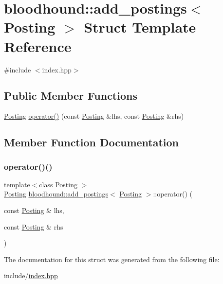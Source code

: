 \hypertarget{structbloodhound_1_1add__postings}{}\section{bloodhound\+:\+:add\+\_\+postings$<$ Posting $>$ Struct Template Reference}
\label{structbloodhound_1_1add__postings}


{\ttfamily \#include $<$index.\+hpp$>$}

\subsection*{Public Member Functions}
\begin{DoxyCompactItemize}
\item 
\mbox{\hyperlink{structbloodhound_1_1Posting}{Posting}} \mbox{\hyperlink{structbloodhound_1_1add__postings_ab57eba72e4d13d7f3c74d749d51c0f34}{operator()}} (const \mbox{\hyperlink{structbloodhound_1_1Posting}{Posting}} \&lhs, const \mbox{\hyperlink{structbloodhound_1_1Posting}{Posting}} \&rhs)
\end{DoxyCompactItemize}


\subsection{Member Function Documentation}
\mbox{\label{structbloodhound_1_1add__postings_ab57eba72e4d13d7f3c74d749d51c0f34}} 
\subsubsection{\texorpdfstring{operator()()}{operator()()}}
{\footnotesize\ttfamily template$<$class Posting $>$ \\
\mbox{\hyperlink{structbloodhound_1_1Posting}{Posting}} \mbox{\hyperlink{structbloodhound_1_1add__postings}{bloodhound\+::add\+\_\+postings}}$<$ \mbox{\hyperlink{structbloodhound_1_1Posting}{Posting}} $>$\+::operator() (\begin{DoxyParamCaption}\item[{const \mbox{\hyperlink{structbloodhound_1_1Posting}{Posting}} \&}]{lhs,  }\item[{const \mbox{\hyperlink{structbloodhound_1_1Posting}{Posting}} \&}]{rhs }\end{DoxyParamCaption})\hspace{0.3cm}{\ttfamily [inline]}}



The documentation for this struct was generated from the following file\+:\begin{DoxyCompactItemize}
\item 
include/\mbox{\hyperlink{index_8hpp}{index.\+hpp}}\end{DoxyCompactItemize}
